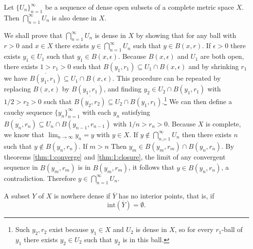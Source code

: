 \documentclass[nobib,notoc]{tufte-handout}
\begin{document}
\begin{thm}
	Let \(\{U_n\}_{n=1}^{\infty}\) be a sequence of dense open subsets of a complete metric space \(X\). Then \(\bigcap_{n=1}^{\infty}U_n\) is also dense in \(X\).
	\begin{IEEEproof}
		We shall prove that \(\bigcap_{n=1}^{\infty}U_n\) is dense in \(X\) by showing that for any ball with \(r>0\) and \(x\in X\)  there exists \(y\in\bigcap_{n=1}^{\infty}U_n\) such that \(y\in B(x,r)\).\bigbreak
		If \(\epsilon>0\) there exists \(y_1\in U_1\) such that \(y_1\in B(x,\epsilon)\). Because \(B(x,\epsilon)\) and \(U_1\) are both open, there exists \(1>r_1>0\) such that \(B(y_1,r_1)\subseteq U_1\cap B(x,\epsilon)\) and by shrinking \(r_1\) we have \(\overline{B(y_1,r_1)}\subseteq U_1\cap B(x,\epsilon)\). This procedure can be repeated by replacing \(B(x,\epsilon)\) by \(B(y_1,r_1)\), and finding \(y_2\in U_2\cap B(y_1,r_1)\) with \(1/2>r_2>0\) such that \(\overline{B(y_2,r_2)}\subseteq U_2\cap B(y_1,r_1)\).\footnote{Such \(y_2,r_2\) exist because \(y_1\in X\) and \(U_2\) is dense in \(X\), so for every \(r_1\)-ball of \(y_1\) there exists \(y_2\in U_2\) such that \(y_2\) is in this ball.}
		We can then define a cauchy sequence \(\{y_n\}_{n=1}^{\infty}\) with each \(y_n\) satisfying \(\overline{B(y_n,r_n)}\subseteq U_{n}\cap B(y_{n-1}, r_{n-1})\) with \(1/n>r_n>0\). Because \(X\) is complete, we know that \(\lim_{n\rightarrow\infty}y_n=y\) with \(y\in X\). If \(y\notin\bigcap_{n=1}^{\infty}U_n\) then there exists \(n\) such that \(y\notin B(y_n,r_n)\). If \(m>n\) Then \(y_m\in \overline{B(y_m,r_m)}\cap B(y_n,r_n)\). By theorems \ref{thm:1:converge} and \ref{thm:1:closure}, the limit of any convergent sequence in \(\overline{B(y_m,r_m)}\) is in \(\overline{B(y_m,r_m)}\), it follows that \(y\in B(y_n,r_n)\), a contradiction. Therefore \(y\in\bigcap_{n=1}^{\infty}U_n\).
	\end{IEEEproof}
\end{thm}
\begin{defi}
	A subset \(Y\) of \(X\) is nowhere dense if \(\overline{Y}\) has no interior points, that is, if
	\begin{equation*}
		\text{int}(\overline{Y})=\emptyset.
	\end{equation*}
\end{defi}
\end{document}
